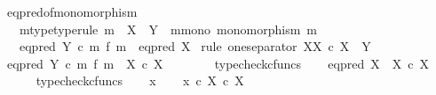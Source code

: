 \begin{isabellebody}
\isanewline
%
\endisadelimproof
\isanewline
{}\isamarkupfalse%
\ eq{\isacharunderscore}{\kern0pt}pred{\isacharunderscore}{\kern0pt}of{\isacharunderscore}{\kern0pt}monomorphism{\isacharcolon}{\kern0pt}\isanewline
\ \ \ m{\isacharunderscore}{\kern0pt}type{\isacharbrackleft}{\kern0pt}type{\isacharunderscore}{\kern0pt}rule{\isacharbrackright}{\kern0pt}{\isacharcolon}{\kern0pt}\ {\isachardoublequoteopen}m\ {\isacharcolon}{\kern0pt}\ X\ {\isasymrightarrow}\ Y{\isachardoublequoteclose}\ \ m{\isacharunderscore}{\kern0pt}mono{\isacharcolon}{\kern0pt}\ {\isachardoublequoteopen}monomorphism\ m{\isachardoublequoteclose}\isanewline
\ \ \ {\isachardoublequoteopen}eq{\isacharunderscore}{\kern0pt}pred\ Y\ {\isasymcirc}\isactrlsub c\ {\isacharparenleft}{\kern0pt}m\ {\isasymtimes}\isactrlsub f\ m{\isacharparenright}{\kern0pt}\ {\isacharequal}{\kern0pt}\ eq{\isacharunderscore}{\kern0pt}pred\ X{\isachardoublequoteclose}\isanewline
%
\isadelimproof
%
\endisadelimproof
%
\isatagproof
{}\isamarkupfalse%
\ {\isacharparenleft}{\kern0pt}rule\ one{\isacharunderscore}{\kern0pt}separator{\isacharbrackleft}{\kern0pt}\ X{\isacharequal}{\kern0pt}{\isachardoublequoteopen}X\ {\isasymtimes}\isactrlsub c\ X{\isachardoublequoteclose}{\isacharcomma}{\kern0pt}\ \ Y{\isacharequal}{\kern0pt}{\isasymOmega}{\isacharbrackright}{\kern0pt}{\isacharparenright}{\kern0pt}\isanewline
\ \ \isamarkupfalse%
\ {\isachardoublequoteopen}eq{\isacharunderscore}{\kern0pt}pred\ Y\ {\isasymcirc}\isactrlsub c\ m\ {\isasymtimes}\isactrlsub f\ m\ {\isacharcolon}{\kern0pt}\ X\ {\isasymtimes}\isactrlsub c\ X\ {\isasymrightarrow}\ {\isasymOmega}{\isachardoublequoteclose}\isanewline
\ \ \ \ \isamarkupfalse%
\ typecheck{\isacharunderscore}{\kern0pt}cfuncs\isanewline
\ \ \isamarkupfalse%
\ {\isachardoublequoteopen}eq{\isacharunderscore}{\kern0pt}pred\ X\ {\isacharcolon}{\kern0pt}\ X\ {\isasymtimes}\isactrlsub c\ X\ {\isasymrightarrow}\ {\isasymOmega}{\isachardoublequoteclose}\isanewline
\ \ \ \ \isamarkupfalse%
\ typecheck{\isacharunderscore}{\kern0pt}cfuncs\isanewline
{}\isamarkupfalse%
\isanewline
\ \ \isamarkupfalse%
\ x\isanewline
\ \ \isamarkupfalse%
\ {\isachardoublequoteopen}x\ {\isasymin}\isactrlsub c\ X\ {\isasymtimes}\isactrlsub c\ X{\isachardoublequoteclose}\isanewline
\ \ \isamarkupfalse%
\ \isamarkupfalse%

\end{isabellebody}
